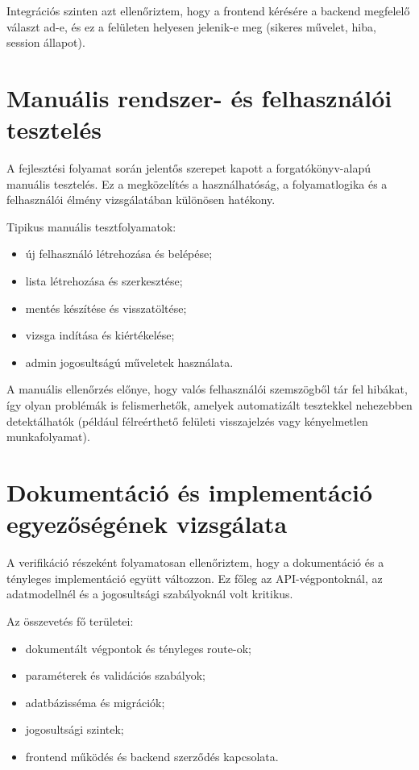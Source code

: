 \documentclass{thesis-ekf}
\begin{document}
Integrációs szinten azt ellenőriztem, hogy a frontend kérésére a backend megfelelő választ ad-e, és ez a felületen helyesen jelenik-e meg (sikeres művelet, hiba, session állapot).

\section{Manuális rendszer- és felhasználói tesztelés}
A fejlesztési folyamat során jelentős szerepet kapott a forgatókönyv-alapú manuális tesztelés. Ez a megközelítés a használhatóság, a folyamatlogika és a felhasználói élmény vizsgálatában különösen hatékony.

Tipikus manuális tesztfolyamatok:
\begin{itemize}
  \item új felhasználó létrehozása és belépése;
  \item lista létrehozása és szerkesztése;
  \item mentés készítése és visszatöltése;
  \item vizsga indítása és kiértékelése;
  \item admin jogosultságú műveletek használata.
\end{itemize}

A manuális ellenőrzés előnye, hogy valós felhasználói szemszögből tár fel hibákat, így olyan problémák is felismerhetők, amelyek automatizált tesztekkel nehezebben detektálhatók (például félreérthető felületi visszajelzés vagy kényelmetlen munkafolyamat).

\section{Dokumentáció és implementáció egyezőségének vizsgálata}
A verifikáció részeként folyamatosan ellenőriztem, hogy a dokumentáció és a tényleges implementáció együtt változzon. Ez főleg az API-végpontoknál, az adatmodellnél és a jogosultsági szabályoknál volt kritikus.

Az összevetés fő területei:
\begin{itemize}
  \item dokumentált végpontok és tényleges route-ok;
  \item paraméterek és validációs szabályok;
  \item adatbázisséma és migrációk;
  \item jogosultsági szintek;
  \item frontend működés és backend szerződés kapcsolata.
\end{itemize}
\end{document}
